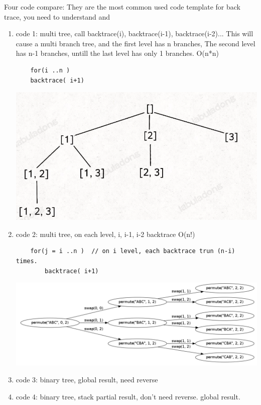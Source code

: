 \documentclass[a4paper,11pt,twoside]{book}
\begin{document}
	\par Four code compare: They are the most common used code template for back trace, you need to understand and 
\begin{enumerate}
	\item code 1: multi tree, call backtrace(i),  backtrace(i-1), backtrace(i-2)... This will cause a multi branch tree, and the first level has n branches, The second level has n-1 branches, untill the last level has only 1 branches.   O(n*n)
\begin{lstlisting}
	for(i ..n )
	backtrace( i+1)
\end{lstlisting}
	
	\begin{center}
		\includegraphics[width=0.6\linewidth]{pics/sub}
	\end{center}
	
	\item code 2: multi tree, on each level,  i, i-1,  i-2 backtrace O(n!)
\begin{lstlisting}
	for(j = i ..n )  // on i level, each backtrace trun (n-i) times. 
		backtrace( i+1)
\end{lstlisting}

	\includegraphics[scale=0.25]{pics/permutation.png}

	\item code 3: binary tree, global result, need reverse
	
	\item code 4: binary tree, stack partial result, don't need reverse. global result.
\end{enumerate}
\end{document}
